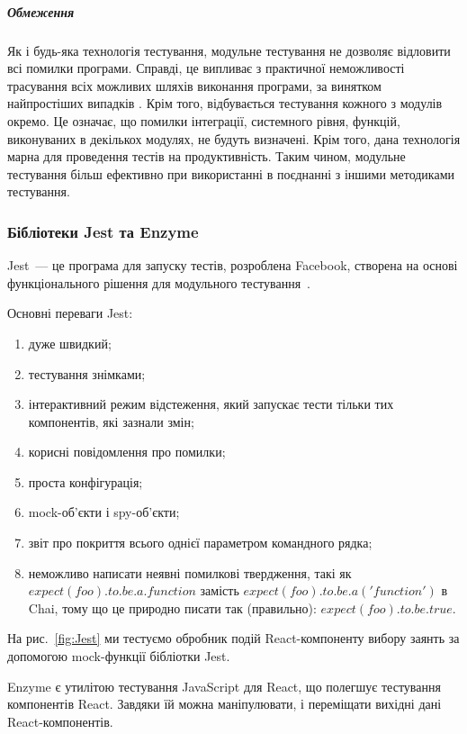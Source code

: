 \subparagraph{Обмеження}

Як і будь-яка технологія тестування, модульне тестування не дозволяє відловити всі помилки програми. Справді, це випливає з практичної неможливості трасування всіх можливих шляхів виконання програми, за винятком найпростіших випадків \cite{бородіна2018selenium}. Крім того, відбувається тестування кожного з модулів окремо. Це означає, що помилки інтеграції, системного рівня, функцій, виконуваних в декількох модулях, не будуть визначені. Крім того, дана технологія марна для проведення тестів на продуктивність. Таким чином, модульне тестування більш ефективно при використанні в поєднанні з іншими методиками тестування.

\subsubsection{Бібліотеки Jest та Enzyme}

Jest~--- це програма для запуску тестів, розроблена Facebook, створена на основі функціонального рішення для модульного тестування~\cite{9781680506464}.

Основні переваги Jest:
\begin{enumerate}
    \item дуже швидкий;
    \item тестування знімками;
    \item інтерактивний режим відстеження, який запускає тести тільки тих компонентів, які зазнали змін;
    \item корисні повідомлення про помилки;
    \item проста конфігурація;
    \item mock-об'єкти і spy-об'єкти;
    \item звіт про покриття всього однієї параметром командного рядка;
    \item неможливо написати неявні помилкові твердження, такі як $expect(foo).to.be.a.function$ замість $expect(foo). to.be.a( 'function')$ в Chai, тому що це природно писати так (правильно): $expect(foo).to.be.true.$
\end{enumerate}


На рис.~\ref{fig:Jest} ми тестуємо обробник подій React-компоненту вибору заянть за допомогою mock-функції бібліотки Jest.

Enzyme є утилітою тестування JavaScript для React, що полегшує тестування компонентів React. Завдяки їй можна маніпулювати, і переміщати вихідні дані React-компонентів.

